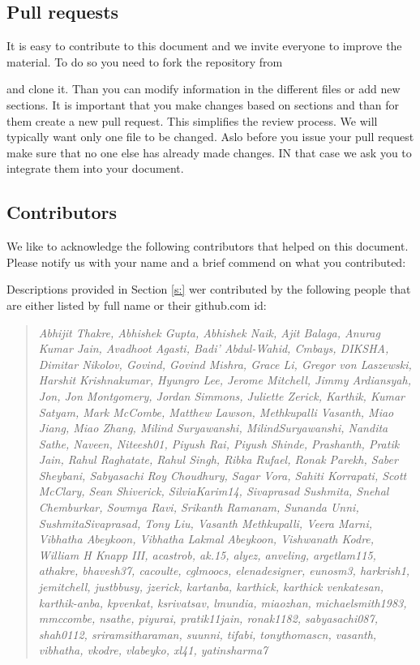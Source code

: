 \subsection{Pull requests}

It is easy to contribute to this document and we invite everyone to
improve the material. To do so you need to fork the repository from 


and clone it. Than you can modify information in the different files
or add new sections. It is important that you make changes based on
sections and than for them create a new pull request. This simplifies
the review process. We will typically want only one file to be
changed. Aslo before you issue your pull request make sure that no one
else has already made changes. IN that case we ask you to integrate
them into your document.


\subsection{Contributors}

We like to acknowledge the following contributors that helped on this
document. Please notify us with your name and a brief commend on what
you contributed:

Descriptions provided in Section \ref{s:} wer contributed by the
following people that are either listed by full name or their
github.com id:

\begin{quotation}{\em
Abhijit Thakre, Abhishek Gupta, Abhishek Naik, Ajit Balaga, Anurag
Kumar Jain, Avadhoot Agasti, Badi' Abdul-Wahid, Cmbays, DIKSHA,
Dimitar Nikolov, Govind, Govind Mishra, Grace Li, Gregor von
Laszewski, Harshit Krishnakumar, Hyungro Lee, Jerome Mitchell, Jimmy
Ardiansyah, Jon, Jon Montgomery, Jordan Simmons, Juliette Zerick,
Karthik, Kumar Satyam, Mark McCombe, Matthew Lawson, Methkupalli
Vasanth, Miao Jiang, Miao Zhang, Milind Suryawanshi,
MilindSuryawanshi, Nandita Sathe, Naveen, Niteesh01, Piyush Rai,
Piyush Shinde, Prashanth, Pratik Jain, Rahul Raghatate, Rahul Singh,
Ribka Rufael, Ronak Parekh, Saber Sheybani, Sabyasachi Roy Choudhury,
Sagar Vora, Sahiti Korrapati, Scott McClary, Sean Shiverick,
SilviaKarim14, Sivaprasad Sushmita, Snehal Chemburkar, Sowmya Ravi,
Srikanth Ramanam, Sunanda Unni, SushmitaSivaprasad, Tony Liu, Vasanth
Methkupalli, Veera Marni, Vibhatha Abeykoon, Vibhatha Lakmal Abeykoon,
Vishwanath Kodre, William H Knapp III, acastrob, ak.15, alyez,
anveling, argetlam115, athakre, bhavesh37, cacoulte, cglmoocs,
elenadesigner, eunosm3, harkrish1, jemitchell, justbbusy, jzerick,
kartanba, karthick, karthick venkatesan, karthik-anba, kpvenkat,
ksrivatsav, lmundia, miaozhan, michaelsmith1983, mmccombe, nsathe,
piyurai, pratik11jain, ronak1182, sabyasachi087,
shah0112, sriramsitharaman, suunni, tifabi, tonythomascn, vasanth,
vibhatha, vkodre, vlabeyko, xl41, yatinsharma7
}\end{quotation}


